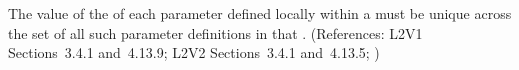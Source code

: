 The value of the   of each parameter defined locally within
a \KineticLaw must be unique across the set of all such parameter
definitions in that \KineticLaw.  (References: L2V1 Sections~3.4.1 and~4.13.9;
L2V2 Sections~3.4.1 and~4.13.5;
)
